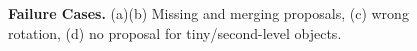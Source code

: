 \begin{figure}[ht]
    \centering
    
    \hfill
    \hfill
    \hfill
    \hfill
	
	\vspace{-0.1in}
    \caption{\textbf{Failure Cases.} (a)(b) Missing and merging proposals, (c) wrong rotation, (d) no proposal for tiny/second-level objects.}
    \vspace{-0.20in}
    \label{fig:failure}
\end{figure}